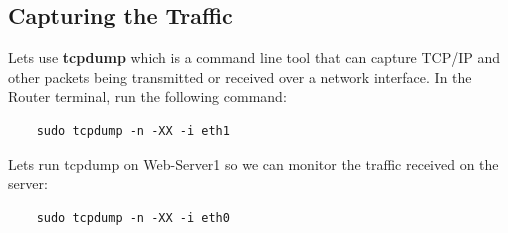 \subsection{Capturing the Traffic}
Lets use \textbf{tcpdump} which is a command line tool that can capture TCP/IP and other packets being transmitted or received over a network interface.
\newline
\newline
In the Router terminal, run the following command:
\begin{verbatim}
    sudo tcpdump -n -XX -i eth1
\end{verbatim}

Lets run tcpdump on Web-Server1 so we can monitor the traffic received on the server:
\begin{verbatim}
    sudo tcpdump -n -XX -i eth0
\end{verbatim}


